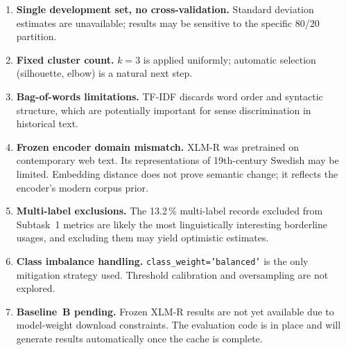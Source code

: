 \begin{enumerate}
  \item \textbf{Single development set, no cross-validation.}
    Standard deviation estimates are unavailable; results may be sensitive
    to the specific 80/20 partition.
  \item \textbf{Fixed cluster count.}
    $k=3$ is applied uniformly; automatic selection (silhouette, elbow) is
    a natural next step.
  \item \textbf{Bag-of-words limitations.}
    TF-IDF discards word order and syntactic structure, which are potentially
    important for sense discrimination in historical text.
  \item \textbf{Frozen encoder domain mismatch.}
    XLM-R was pretrained on contemporary web text.  Its representations of
    19th-century Swedish may be limited.  Embedding distance does not prove
    semantic change; it reflects the encoder's modern corpus prior.
  \item \textbf{Multi-label exclusions.}
    The 13.2\,\% multi-label records excluded from Subtask~1 metrics are
    likely the most linguistically interesting borderline usages, and
    excluding them may yield optimistic estimates.
  \item \textbf{Class imbalance handling.}
    \texttt{class\_weight='balanced'} is the only mitigation strategy used.
    Threshold calibration and oversampling are not explored.
  \item \textbf{Baseline~B pending.}
    Frozen XLM-R results are not yet available due to model-weight download
    constraints.  The evaluation code is in place and will generate results
    automatically once the cache is complete.
\end{enumerate}
